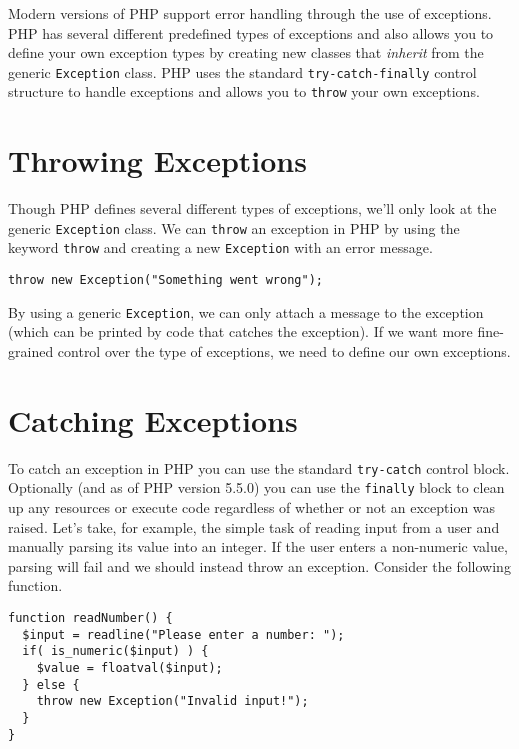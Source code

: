 

Modern versions of PHP support error handling through the 
use of exceptions.  PHP has several different predefined
types of exceptions and also allows you to define your own 
exception types by creating new classes that \emph{inherit} 
from the generic \texttt{Exception} 
class.  PHP uses the standard \texttt{try-catch-finally} 
control structure to handle exceptions and allows you to 
\texttt{throw} your own exceptions.


\section{Throwing Exceptions}

Though PHP defines several different types of exceptions, 
we'll only look at the generic \texttt{Exception} class.
We can \texttt{throw} an exception in PHP by using the
keyword \texttt{throw} and creating a new \texttt{Exception}
with an error message.  

\begin{verbatim}
throw new Exception("Something went wrong");
\end{verbatim}

By using a generic \texttt{Exception}, we
can only attach a message to the exception (which can be
printed by code that catches the exception).  If we want
more fine-grained control over the type of exceptions, we
need to define our own exceptions.

\section{Catching Exceptions}

To catch an exception in PHP you can use the standard
\texttt{try-catch} control block.  Optionally (and as
of PHP version 5.5.0) you can use the \texttt{finally} 
block to clean up any resources or execute code regardless of
whether or not an exception was raised.  Let's take, for example, 
the simple task of reading input from a user 
and manually parsing its value into an integer.  If the
user enters a non-numeric value, parsing will fail
and we should instead throw an exception. Consider
the following function.

\begin{verbatim}
function readNumber() {
  $input = readline("Please enter a number: ");
  if( is_numeric($input) ) {
    $value = floatval($input);
  } else {
    throw new Exception("Invalid input!");
  }
}
\end{verbatim}

